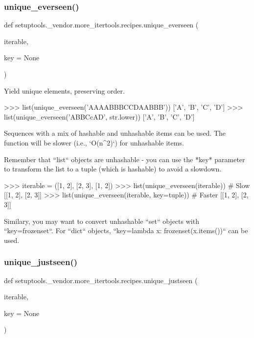 \subsubsection{\texorpdfstring{unique\+\_\+everseen()}{unique\_everseen()}}
{\footnotesize\ttfamily def setuptools.\+\_\+vendor.\+more\+\_\+itertools.\+recipes.\+unique\+\_\+everseen (\begin{DoxyParamCaption}\item[{}]{iterable,  }\item[{}]{key = {\ttfamily None} }\end{DoxyParamCaption})}

\begin{DoxyVerb}Yield unique elements, preserving order.

    >>> list(unique_everseen('AAAABBBCCDAABBB'))
    ['A', 'B', 'C', 'D']
    >>> list(unique_everseen('ABBCcAD', str.lower))
    ['A', 'B', 'C', 'D']

Sequences with a mix of hashable and unhashable items can be used.
The function will be slower (i.e., `O(n^2)`) for unhashable items.

Remember that ``list`` objects are unhashable - you can use the *key*
parameter to transform the list to a tuple (which is hashable) to
avoid a slowdown.

    >>> iterable = ([1, 2], [2, 3], [1, 2])
    >>> list(unique_everseen(iterable))  # Slow
    [[1, 2], [2, 3]]
    >>> list(unique_everseen(iterable, key=tuple))  # Faster
    [[1, 2], [2, 3]]

Similary, you may want to convert unhashable ``set`` objects with
``key=frozenset``. For ``dict`` objects,
``key=lambda x: frozenset(x.items())`` can be used.\end{DoxyVerb}
 \mbox{\label{namespacesetuptools_1_1__vendor_1_1more__itertools_1_1recipes_adfcd7d1a1b8a89c782405d2616a64c9b}} 
\subsubsection{\texorpdfstring{unique\+\_\+justseen()}{unique\_justseen()}}
{\footnotesize\ttfamily def setuptools.\+\_\+vendor.\+more\+\_\+itertools.\+recipes.\+unique\+\_\+justseen (\begin{DoxyParamCaption}\item[{}]{iterable,  }\item[{}]{key = {\ttfamily None} }\end{DoxyParamCaption})}

